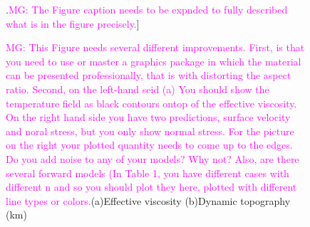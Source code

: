 \documentclass[12pt]{article}
\newcommand{\mgnote}[1]{\textcolor{magenta}{MG: #1}}
\begin{document}
\begin{figure}[H]
\centering
{}
\caption{\mgnote{This Figure needs several different improvements. First, is that you need to use or master a graphics package in which the material can be presented professionally, that is with distorting the aspect ratio. Second, on the left-hand seid (a) You should show the temperature field as black contours ontop of the effective viscosity. On the right hand side you have two predictions, surface velocity and noral stress, but you only show normal stress. For the picture on the right your plotted quantity needs to come up to the edges. Do you add noise to any of your models? Why not? Also, are there several forward models (In Table 1, you have different cases with different n and so you should plot they here, plotted with different line types or colors.}(a)Effective viscosity (b)Dynamic topography (km)}.\mgnote{The Figure caption needs to be expnded to fully described what is in the figure precisely.}] 
\label{fig:viscosity}
\end{figure}
 
\end{document}
